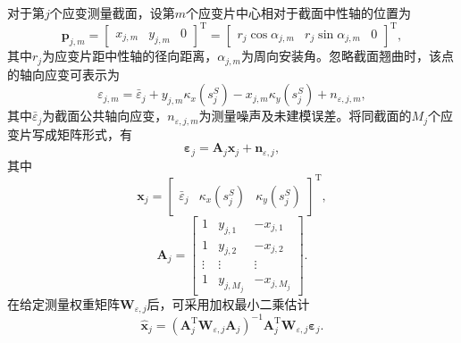 对于第$j$个应变测量截面，设第$m$个应变片中心相对于截面中性轴的位置为
\begin{equation}
    \bm p_{j,m}=
    \begin{bmatrix}
        x_{j,m} & y_{j,m} & 0
    \end{bmatrix}^{\mathrm T}
    =
    \begin{bmatrix}
        r_j\cos\alpha_{j,m} & r_j\sin\alpha_{j,m} & 0
    \end{bmatrix}^{\mathrm T},
\end{equation}
其中$r_j$为应变片距中性轴的径向距离，$\alpha_{j,m}$为周向安装角。忽略截面翘曲时，该点的轴向应变可表示为
\begin{equation}
    \varepsilon_{j,m}
    =\bar\varepsilon_j
    +y_{j,m}\kappa_x(s_j^S)
    -x_{j,m}\kappa_y(s_j^S)
    +n_{\varepsilon,j,m},
    \label{eq:strain_curvature_single}
\end{equation}
其中$\bar\varepsilon_j$为截面公共轴向应变，$n_{\varepsilon,j,m}$为测量噪声及未建模误差。将同截面的$M_j$个应变片写成矩阵形式，有
\begin{equation}
    \bm\varepsilon_j
    =\bm A_j\bm x_j+\bm n_{\varepsilon,j},
\end{equation}
其中
\begin{equation}
    \bm x_j=
    \begin{bmatrix}
        \bar\varepsilon_j & \kappa_x(s_j^S) & \kappa_y(s_j^S)
    \end{bmatrix}^{\mathrm T},
\end{equation}
\begin{equation}
    \bm A_j=
    \begin{bmatrix}
        1 & y_{j,1} & -x_{j,1}\\
        1 & y_{j,2} & -x_{j,2}\\
        \vdots & \vdots & \vdots\\
        1 & y_{j,M_j} & -x_{j,M_j}
    \end{bmatrix}.
\end{equation}
在给定测量权重矩阵$\bm W_{\varepsilon,j}$后，可采用加权最小二乘估计
\begin{equation}
    \hat{\bm x}_j
    =\left(\bm A_j^{\mathrm T}\bm W_{\varepsilon,j}\bm A_j\right)^{-1}
    \bm A_j^{\mathrm T}\bm W_{\varepsilon,j}\bm\varepsilon_j.
    \label{eq:strain_wls}
\end{equation}

